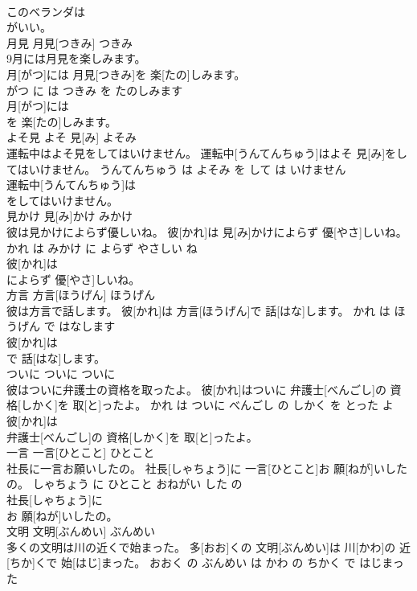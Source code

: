 \documentclass[8pt]{extreport}
\begin{document}
\begin{CJK}{UTF8}{min}
\\	このベランダは
\\	がいい。			
\\	月見	月見[つきみ]	つきみ	
\\	9月には月見を楽しみます。	
\\	月[がつ]には 月見[つきみ]を 楽[たの]しみます。	
\\	がつ に は つきみ を たのしみます	
\\	月[がつ]には
\\	を 楽[たの]しみます。			
\\	よそ見	よそ 見[み]	よそみ	
\\	運転中はよそ見をしてはいけません。	運転中[うんてんちゅう]はよそ 見[み]をしてはいけません。	うんてんちゅう は よそみ を して は いけません	
\\	運転中[うんてんちゅう]は
\\	をしてはいけません。			
\\	見かけ	見[み]かけ	みかけ	
\\	彼は見かけによらず優しいね。	彼[かれ]は 見[み]かけによらず 優[やさ]しいね。	かれ は みかけ に よらず やさしい ね	
\\	彼[かれ]は
\\	によらず 優[やさ]しいね。			
\\	方言	方言[ほうげん]	ほうげん	
\\	彼は方言で話します。	彼[かれ]は 方言[ほうげん]で 話[はな]します。	かれ は ほうげん で はなします	
\\	彼[かれ]は
\\	で 話[はな]します。			
\\	ついに	ついに	ついに	
\\	彼はついに弁護士の資格を取ったよ。	彼[かれ]はついに 弁護士[べんごし]の 資格[しかく]を 取[と]ったよ。	かれ は ついに べんごし の しかく を とった よ	
\\	彼[かれ]は
\\	弁護士[べんごし]の 資格[しかく]を 取[と]ったよ。			
\\	一言	一言[ひとこと]	ひとこと	
\\	社長に一言お願いしたの。	社長[しゃちょう]に 一言[ひとこと]お 願[ねが]いしたの。	しゃちょう に ひとこと おねがい した の	
\\	社長[しゃちょう]に
\\	お 願[ねが]いしたの。			
\\	文明	文明[ぶんめい]	ぶんめい	
\\	多くの文明は川の近くで始まった。	多[おお]くの 文明[ぶんめい]は 川[かわ]の 近[ちか]くで 始[はじ]まった。	おおく の ぶんめい は かわ の ちかく で はじまった	

\end{CJK}
\end{document}
